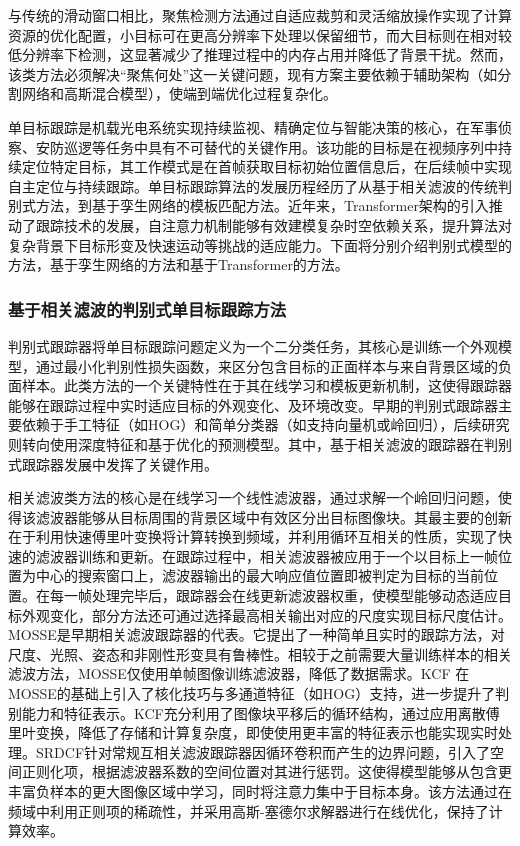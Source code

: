 与传统的滑动窗口相比，聚焦检测方法通过自适应裁剪和灵活缩放操作实现了计算资源的优化配置，小目标可在更高分辨率下处理以保留细节，而大目标则在相对较低分辨率下检测，这显著减少了推理过程中的内存占用并降低了背景干扰。然而，该类方法必须解决“聚焦何处”这一关键问题，现有方案主要依赖于辅助架构（如分割网络和高斯混合模型），使端到端优化过程复杂化。


单目标跟踪是机载光电系统实现持续监视、精确定位与智能决策的核心，在军事侦察、安防巡逻等任务中具有不可替代的关键作用。该功能的目标是在视频序列中持续定位特定目标，其工作模式是在首帧获取目标初始位置信息后，在后续帧中实现自主定位与持续跟踪。单目标跟踪算法的发展历程经历了从基于相关滤波的传统判别式方法，到基于孪生网络的模板匹配方法\cite{XXYK202201003}。近年来，Transformer架构的引入推动了跟踪技术的发展，自注意力机制能够有效建模复杂时空依赖关系，提升算法对复杂背景下目标形变及快速运动等挑战的适应能力。下面将分别介绍判别式模型的方法，基于孪生网络的方法和基于Transformer的方法。

\subsubsection{基于相关滤波的判别式单目标跟踪方法}
判别式跟踪器将单目标跟踪问题定义为一个二分类任务，其核心是训练一个外观模型，通过最小化判别性损失函数，来区分包含目标的正面样本与来自背景区域的负面样本。此类方法的一个关键特性在于其在线学习和模板更新机制，这使得跟踪器能够在跟踪过程中实时适应目标的外观变化、及环境改变。早期的判别式跟踪器主要依赖于手工特征（如HOG\cite{Dalal2005HOG}）和简单分类器（如支持向量机或岭回归），后续研究则转向使用深度特征和基于优化的预测模型。其中，基于相关滤波的跟踪器在判别式跟踪器发展中发挥了关键作用。

相关滤波类方法的核心是在线学习一个线性滤波器，通过求解一个岭回归问题，使得该滤波器能够从目标周围的背景区域中有效区分出目标图像块。其最主要的创新在于利用快速傅里叶变换将计算转换到频域，并利用循环互相关的性质，实现了快速的滤波器训练和更新。在跟踪过程中，相关滤波器被应用于一个以目标上一帧位置为中心的搜索窗口上，滤波器输出的最大响应值位置即被判定为目标的当前位置。在每一帧处理完毕后，跟踪器会在线更新滤波器权重，使模型能够动态适应目标外观变化，部分方法还可通过选择最高相关输出对应的尺度实现目标尺度估计。MOSSE\cite{Bolme2010MOSSE}是早期相关滤波跟踪器的代表。它提出了一种简单且实时的跟踪方法，对尺度、光照、姿态和非刚性形变具有鲁棒性。相较于之前需要大量训练样本的相关滤波方法，MOSSE仅使用单帧图像训练滤波器，降低了数据需求。KCF\cite{Henriques2015KCF} 在MOSSE的基础上引入了核化技巧与多通道特征（如HOG）支持，进一步提升了判别能力和特征表示。KCF充分利用了图像块平移后的循环结构，通过应用离散傅里叶变换，降低了存储和计算复杂度，即使使用更丰富的特征表示也能实现实时处理。SRDCF\cite{Danelljan2015SRDCF}针对常规互相关滤波跟踪器因循环卷积而产生的边界问题，引入了空间正则化项，根据滤波器系数的空间位置对其进行惩罚。这使得模型能够从包含更丰富负样本的更大图像区域中学习，同时将注意力集中于目标本身。该方法通过在频域中利用正则项的稀疏性，并采用高斯-塞德尔求解器进行在线优化，保持了计算效率。

